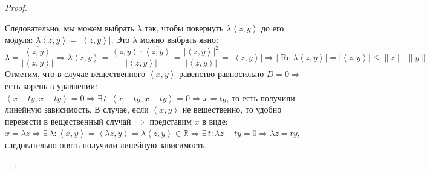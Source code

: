 \documentclass[12pt]{article}
\newcommand{\MR}{\mathbb{R}}
\theoremstyle{definition}
\newcommand{\inner}[2]{\left\langle #1, #2 \right\rangle }
\begin{document}
\begin{proof}
\begin{enumerate}[label=(\arabic*)]
\begin{figure}[H]
			\label{fig: Поворот на плоскости}
		\end{figure}
		Следовательно, мы можем выбрать $\lambda$ так, чтобы повернуть $\lambda \inner{z}{y}$ до его модуля: $\lambda \inner{z}{y} = |\inner{z}{y}|$. 
		Это $\lambda$ можно выбрать явно:
		$$
			\lambda = \dfrac{\overline{\inner{z}{y}}}{|\inner{z}{y}|} \Rightarrow \lambda\inner{z}{y} = \dfrac{\inner{z}{y}{\cdot}\overline{\inner{z}{y}}}{|\inner{z}{y}|} = \dfrac{|\inner{z}{y}|^2}{|\inner{z}{y}|} = |\inner{z}{y}| \Rightarrow |\operatorname{Re}\lambda\inner{z}{y}| = |\inner{z}{y}|\leq \|z\|{\cdot}\|y\|
		$$
		Отметим, что в случае вещественного $\inner{x}{y}$ равенство равносильно $D = 0 \Rightarrow$ есть корень в уравнении: $\inner{x -ty}{x-ty} = 0 \Rightarrow \exists \, t \colon \inner{x - ty}{x - ty} = 0 \Rightarrow x = ty$, то есть получили линейную зависимость. В случае, если $\inner{x}{y}$ не вещественно, то удобно перевести в вещественный случай $\Rightarrow$ представим $x$ в виде: $x = \lambda z \Rightarrow \exists \, \lambda \colon \inner{x}{y} =  \inner{\lambda z}{y}  =\lambda \inner{z}{y	} \in \MR \Rightarrow \exists \, t \colon \lambda z - ty = 0 \Rightarrow \lambda z =ty$, следовательно опять получили линейную зависимость. 
	\end{enumerate}
\end{proof}
\end{document}
